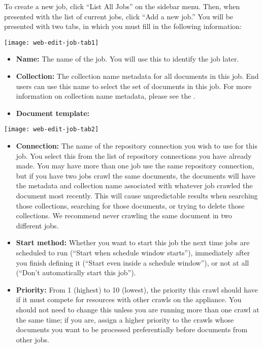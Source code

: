 \begin{changemargin}{1.5in}{0in}
To create a new job, click ``List All Jobs'' on the sidebar menu. Then, when
presented with the list of current jobs, click ``Add a new job.'' You
will be presented with two tabs, in which you must fill in the following
information:

\texttt{[image: web-edit-job-tab1]}

\begin{itemize}

\item \textbf{Name:} The name of the job. You will use this to identify
the job later.

\item \textbf{Collection:} The collection name metadata for all
documents in this job. End users can use this name to select the set
of documents in this job. For more information on collection name
metadata, please see the .

\item \textbf{Document template:} 

\end{itemize}

\texttt{[image: web-edit-job-tab2]}

\begin{itemize}

\item \textbf{Connection:} The name of the repository connection you
wish to use for this job. You select this from the list of repository
connections you have already made. You may have more than one job use
the same repository connection, but if you have two jobs crawl the same
documents, the documents will have the metadata and collection name
associated with whatever job crawled the document most recently. This
will cause unpredictable results when searching those collections,
searching for those documents, or trying to delete those collections.
We recommend never crawling the same document in two different jobs.

\item \textbf{Start method:} Whether you want to start this job the next
time jobs are scheduled to run (``Start when schedule window starts''),
immediately after you finish defining it (``Start even inside a schedule
window''), or not at all (``Don't automatically start this job'').

\item \textbf{Priority:} From 1 (highest) to 10 (lowest), the priority
this crawl should have if it must compete for resources with other
crawls on the appliance. You should not need to change this unless you
are running more than one crawl at the same time; if you are, assign a
higher priority to the crawls whose documents you want to be processed
preferentially before documents from other jobs.


\end{itemize}
\end{changemargin}

